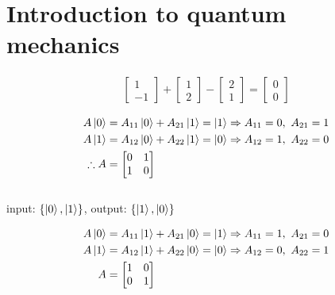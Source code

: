 \setcounter{chapter}{1}
\chapter{Introduction to quantum mechanics}

\begin{align*}
	\begin{bmatrix}
		1 \\ 
		-1
	\end{bmatrix}
	+
	\begin{bmatrix}
		1 \\ 
		2
	\end{bmatrix}
	-
	\begin{bmatrix}
		2 \\ 
		1
	\end{bmatrix}
	=
	\begin{bmatrix}
		0 \\ 
		0
	\end{bmatrix}
\end{align*}


\begin{align*}
	A\ket{0} &= A_{11}\ket{0} + A_{21}\ket{1} = \ket{1} \Rightarrow A_{11} = 0,\ A_{21} = 1\\
	A\ket{1} &= A_{12}\ket{0} + A_{22}\ket{1} = \ket{0} \Rightarrow A_{12} = 1,\ A_{22} = 0\\
%
	\therefore A &=
	\begin{bmatrix}
		0 & 1 \\ 
		1 & 0
	\end{bmatrix}
\end{align*}\\

input: $\left\{\ket{0}, \ket{1}\right\}$,
output: $\left\{\ket{1}, \ket{0}\right\}$

\begin{align*}
	A\ket{0}&= A_{11}\ket{1} + A_{21}\ket{0} = \ket{1} \Rightarrow A_{11} = 1,\ A_{21} = 0\\
%
	A\ket{1} &= A_{12}\ket{1} + A_{22}\ket{0} = \ket{0} \Rightarrow A_{12} = 0,\ A_{22} = 1\\
%
	A &=
	\begin{bmatrix}
	1 & 0 \\ 
	0 & 1
	\end{bmatrix}
\end{align*}



